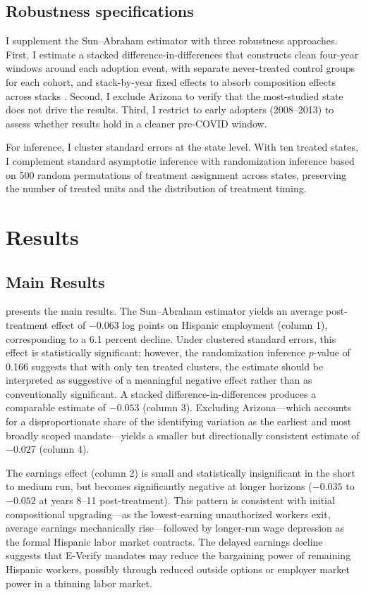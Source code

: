 \documentclass[12pt]{article}
\begin{document}
\subsection{Robustness specifications}

I supplement the Sun--Abraham estimator with three robustness approaches. First, I estimate a stacked difference-in-differences that constructs clean four-year windows around each adoption event, with separate never-treated control groups for each cohort, and stack-by-year fixed effects to absorb composition effects across stacks \citep{cengiz2019}. Second, I exclude Arizona to verify that the most-studied state does not drive the results. Third, I restrict to early adopters (2008--2013) to assess whether results hold in a cleaner pre-COVID window.

For inference, I cluster standard errors at the state level. With ten treated states, I complement standard asymptotic inference with randomization inference based on 500 random permutations of treatment assignment across states, preserving the number of treated units and the distribution of treatment timing.


\section{Results}

\subsection{Main Results}

 presents the main results. The Sun--Abraham estimator yields an average post-treatment effect of $-0.063$ log points on Hispanic employment (column 1), corresponding to a 6.1 percent decline. Under clustered standard errors, this effect is statistically significant; however, the randomization inference $p$-value of 0.166 suggests that with only ten treated clusters, the estimate should be interpreted as suggestive of a meaningful negative effect rather than as conventionally significant. A stacked difference-in-differences produces a comparable estimate of $-0.053$ (column 3). Excluding Arizona---which accounts for a disproportionate share of the identifying variation as the earliest and most broadly scoped mandate---yields a smaller but directionally consistent estimate of $-0.027$ (column 4).



The earnings effect (column 2) is small and statistically insignificant in the short to medium run, but becomes significantly negative at longer horizons ($-0.035$ to $-0.052$ at years 8--11 post-treatment). This pattern is consistent with initial compositional upgrading---as the lowest-earning unauthorized workers exit, average earnings mechanically rise---followed by longer-run wage depression as the formal Hispanic labor market contracts. The delayed earnings decline suggests that E-Verify mandates may reduce the bargaining power of remaining Hispanic workers, possibly through reduced outside options or employer market power in a thinning labor market.
\end{document}
